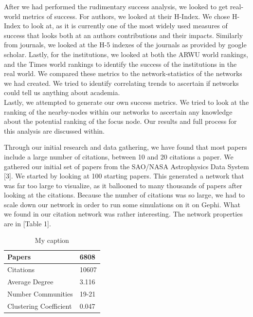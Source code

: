 \documentclass[times, 10pt,twocolumn]{article}
\begin{document}
After we had performed the rudimentary success analysis, we looked to get real-world metrics of success. For authors, we looked at their H-Index. We chose H-Index to look at, as it is currently one of the most widely used measures of success that looks both at an authors contributions and their impacts. Similarly from journals, we looked at the H-5 indexes of the journals as provided by google scholar. Lastly, for the institutions, we looked at both the ARWU world rankings, and the Times world rankings to identify the success of the institutions in the real world. We compared these metrics to the network-statistics of the networks we had created. We tried to identify correlating trends to ascertain if networks could tell us anything about academia. \\

Lastly, we attempted to generate our own success metrics. We tried to look at the ranking of the nearby-nodes within our networks to ascertain any knowledge about the potential ranking of the focus node. Our results and full process for this analysis are discussed within.

Through our initial research and data gathering, we have found that most papers include a large number of citations, between 10 and 20 citations a paper. We gathered our initial set of papers from the SAO/NASA Astrophysics Data System [3]. We started by looking at 100  starting papers. This generated a network that was far too large to visualize, as it ballooned to many thousands of papers after looking at the citations. Because the number of citations was so large, we had to scale down our network in order to run some simulations on it on Gephi. What we found in our citation network was rather interesting. The network properties are in [Table 1].

\begin{table}[h]
\centering
\caption{My caption}
\label{my-label}
\begin{tabular}{|l|l|}
\hline
Papers                 & 6808  \\ \hline
Citations              & 10607 \\ \hline
Average Degree         & 3.116 \\ \hline
Number Communities     & 19-21 \\ \hline
Clustering Coefficient & 0.047 \\ \hline
\end{tabular}
\end{table}
\end{document}

